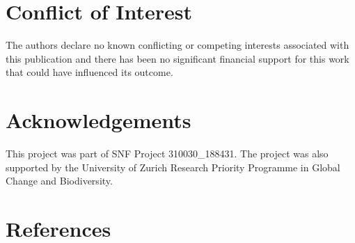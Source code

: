 \documentclass[
]{article}
\begin{document}
\hypertarget{conflict-of-interest}{%
\section{Conflict of Interest}\label{conflict-of-interest}}

The authors declare no known conflicting or competing interests associated with this publication and there has been no significant financial support for this work that could have influenced its outcome.

\hypertarget{acknowledgements}{%
\section{Acknowledgements}\label{acknowledgements}}

This project was part of SNF Project 310030\_188431. The project was also supported by the University of Zurich Research Priority Programme in Global Change and Biodiversity.

\hypertarget{references}{%
\section*{References}\label{references}}
\end{document}
